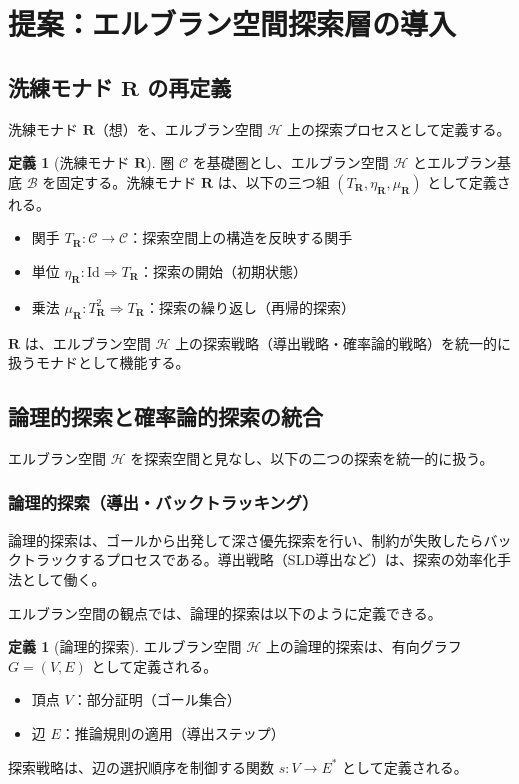 \documentclass[11pt,a4paper]{ltjsarticle}
\theoremstyle{definition}
\newtheorem{definition}[theorem]{定義}
\newcommand{\Mr}{\mathbf{R}}
\newcommand{\Herbrand}{\mathcal{H}}
\newcommand{\Herbase}{\mathcal{B}}
\begin{document}
\section{提案：エルブラン空間探索層の導入}

\subsection{洗練モナド $\Mr$ の再定義}

洗練モナド $\Mr$（想）を、エルブラン空間 $\Herbrand$ 上の探索プロセスとして定義する。

\begin{definition}[洗練モナド $\Mr$]
圏 $\mathcal{C}$ を基礎圏とし、エルブラン空間 $\Herbrand$ とエルブラン基底 $\Herbase$ を固定する。洗練モナド $\Mr$ は、以下の三つ組 $(T_{\Mr}, \eta_{\Mr}, \mu_{\Mr})$ として定義される。
\begin{itemize}
\item 関手 $T_{\Mr} : \mathcal{C} \to \mathcal{C}$：探索空間上の構造を反映する関手
\item 単位 $\eta_{\Mr} : \mathrm{Id} \Rightarrow T_{\Mr}$：探索の開始（初期状態）
\item 乗法 $\mu_{\Mr} : T_{\Mr}^2 \Rightarrow T_{\Mr}$：探索の繰り返し（再帰的探索）
\end{itemize}
\end{definition}

$\Mr$ は、エルブラン空間 $\Herbrand$ 上の探索戦略（導出戦略・確率論的戦略）を統一的に扱うモナドとして機能する。

\subsection{論理的探索と確率論的探索の統合}

エルブラン空間 $\Herbrand$ を探索空間と見なし、以下の二つの探索を統一的に扱う。

\subsubsection{論理的探索（導出・バックトラッキング）}

論理的探索は、ゴールから出発して深さ優先探索を行い、制約が失敗したらバックトラックするプロセスである。導出戦略（SLD導出など）は、探索の効率化手法として働く\cite{resolution}。

エルブラン空間の観点では、論理的探索は以下のように定義できる。

\begin{definition}[論理的探索]
エルブラン空間 $\Herbrand$ 上の論理的探索は、有向グラフ $G = (V, E)$ として定義される。
\begin{itemize}
\item 頂点 $V$：部分証明（ゴール集合）
\item 辺 $E$：推論規則の適用（導出ステップ）
\end{itemize}
探索戦略は、辺の選択順序を制御する関数 $s : V \to E^*$ として定義される。
\end{definition}
\end{document}
